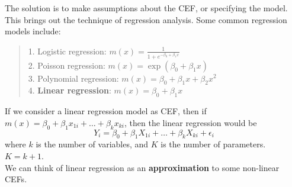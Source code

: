 The solution is to make assumptions about the CEF, or specifying the model. This brings out the technique of regression analysis. Some common regression models include:
\begin{quote}
    1. Logistic regression: $m(x) = \frac{1}{1 + e^{-\beta_0 + \beta_1 x}}$ \\
    2. Poisson regression: $m(x) = \exp(\beta_0 + \beta_1 x)$ \\
    3. Polynomial regression: $m(x) = \beta_0 + \beta_1 x + \beta_2 x^2$ \\
    4. \textbf{Linear regression}: $m(x) = \beta_0 + \beta_1 x$
\end{quote}
If we consider a linear regression model as CEF, then if $m(x) = \beta_0 + \beta_1 x_{1i} + \dots + \beta_k x_{ki}$, then the linear regression would be
$$Y_i = \beta_0 + \beta_1 X_{1i} + \dots + \beta_k X_{ki} + \epsilon_i$$
where $k$ is the number of variables, and $K$ is the number of parameters. $K = k + 1$. \\
We can think of linear regression as an \textbf{approximation} to some non-linear CEFs.

\newpage